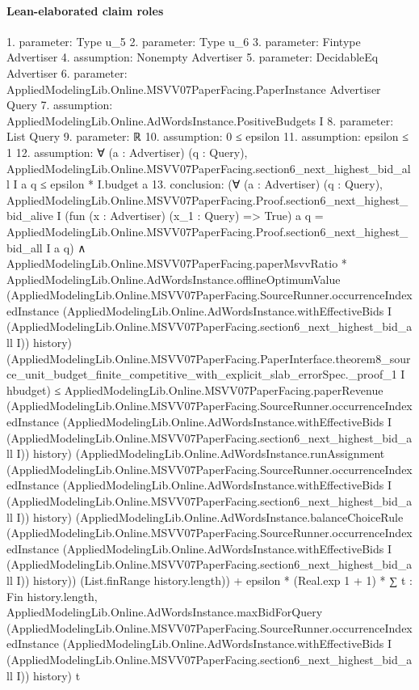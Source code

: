 \documentclass[10pt]{article}
\begin{document}
\paragraph{Lean-elaborated claim roles}\begin{ReviewVerbatim}
1. parameter: Type u_5
2. parameter: Type u_6
3. parameter: Fintype Advertiser
4. assumption: Nonempty Advertiser
5. parameter: DecidableEq Advertiser
6. parameter: AppliedModelingLib.Online.MSVV07PaperFacing.PaperInstance Advertiser Query
7. assumption: AppliedModelingLib.Online.AdWordsInstance.PositiveBudgets I
8. parameter: List Query
9. parameter: ℝ
10. assumption: 0 ≤ epsilon
11. assumption: epsilon ≤ 1
12. assumption: ∀ (a : Advertiser) (q : Query),
  AppliedModelingLib.Online.MSVV07PaperFacing.section6_next_highest_bid_all I a q ≤ epsilon * I.budget a
13. conclusion: (∀ (a : Advertiser) (q : Query),
    AppliedModelingLib.Online.MSVV07PaperFacing.Proof.section6_next_highest_bid_alive I
        (fun (x : Advertiser) (x_1 : Query) => True) a q =
      AppliedModelingLib.Online.MSVV07PaperFacing.Proof.section6_next_highest_bid_all I a q) ∧
  AppliedModelingLib.Online.MSVV07PaperFacing.paperMsvvRatio *
      AppliedModelingLib.Online.AdWordsInstance.offlineOptimumValue
        (AppliedModelingLib.Online.MSVV07PaperFacing.SourceRunner.occurrenceIndexedInstance
          (AppliedModelingLib.Online.AdWordsInstance.withEffectiveBids I
            (AppliedModelingLib.Online.MSVV07PaperFacing.section6_next_highest_bid_all I))
          history)
        (AppliedModelingLib.Online.MSVV07PaperFacing.PaperInterface.theorem8_source_unit_budget_finite_competitive_with_explicit_slab_errorSpec._proof_1
          I hbudget) ≤
    AppliedModelingLib.Online.MSVV07PaperFacing.paperRevenue
        (AppliedModelingLib.Online.MSVV07PaperFacing.SourceRunner.occurrenceIndexedInstance
          (AppliedModelingLib.Online.AdWordsInstance.withEffectiveBids I
            (AppliedModelingLib.Online.MSVV07PaperFacing.section6_next_highest_bid_all I))
          history)
        (AppliedModelingLib.Online.AdWordsInstance.runAssignment
          (AppliedModelingLib.Online.MSVV07PaperFacing.SourceRunner.occurrenceIndexedInstance
            (AppliedModelingLib.Online.AdWordsInstance.withEffectiveBids I
              (AppliedModelingLib.Online.MSVV07PaperFacing.section6_next_highest_bid_all I))
            history)
          (AppliedModelingLib.Online.AdWordsInstance.balanceChoiceRule
            (AppliedModelingLib.Online.MSVV07PaperFacing.SourceRunner.occurrenceIndexedInstance
              (AppliedModelingLib.Online.AdWordsInstance.withEffectiveBids I
                (AppliedModelingLib.Online.MSVV07PaperFacing.section6_next_highest_bid_all I))
              history))
          (List.finRange history.length)) +
      epsilon * (Real.exp 1 + 1) *
        ∑ t : Fin history.length,
          AppliedModelingLib.Online.AdWordsInstance.maxBidForQuery
            (AppliedModelingLib.Online.MSVV07PaperFacing.SourceRunner.occurrenceIndexedInstance
              (AppliedModelingLib.Online.AdWordsInstance.withEffectiveBids I
                (AppliedModelingLib.Online.MSVV07PaperFacing.section6_next_highest_bid_all I))
              history)
            t
\end{ReviewVerbatim}
\end{document}
